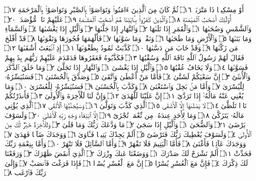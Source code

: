أَوْ مِسْكِينࣰا ذَا مَتْرَبَةࣲ ۝١٦ ثُمَّ كَانَ مِنَ ٱلَّذِينَ ءَامَنُوا۟ وَتَوَاصَوْا۟
بِٱلصَّبْرِ وَتَوَاصَوْا۟ بِٱلْمَرْحَمَةِ ۝١٧ أُو۟لَٰٓئِكَ أَصْحَٰبُ ٱلْمَيْمَنَةِ ۝١٨
وَٱلَّذِينَ كَفَرُوا۟ بِـَٔايَٰتِنَا هُمْ أَصْحَٰبُ ٱلْمَشْـَٔمَةِ ۝١٩ عَلَيْهِمْ نَارࣱ مُّؤْصَدَةُۢ ۝٢٠
وَٱلشَّمْسِ وَضُحَىٰهَا ۝١ وَٱلْقَمَرِ إِذَا تَلَىٰهَا ۝٢ وَٱلنَّهَارِ إِذَا جَلَّىٰهَا ۝٣
وَٱلَّيْلِ إِذَا يَغْشَىٰهَا ۝٤ وَٱلسَّمَآءِ وَمَا بَنَىٰهَا ۝٥ وَٱلْأَرْضِ
وَمَا طَحَىٰهَا ۝٦ وَنَفْسࣲ وَمَا سَوَّىٰهَا ۝٧ فَأَلْهَمَهَا فُجُورَهَا
وَتَقْوَىٰهَا ۝٨ قَدْ أَفْلَحَ مَن زَكَّىٰهَا ۝٩ وَقَدْ خَابَ مَن دَسَّىٰهَا ۝١٠
كَذَّبَتْ ثَمُودُ بِطَغْوَىٰهَآ ۝١١ إِذِ ٱنۢبَعَثَ أَشْقَىٰهَا ۝١٢ فَقَالَ لَهُمْ
رَسُولُ ٱللَّهِ نَاقَةَ ٱللَّهِ وَسُقْيَٰهَا ۝١٣ فَكَذَّبُوهُ فَعَقَرُوهَا فَدَمْدَمَ
عَلَيْهِمْ رَبُّهُم بِذَنۢبِهِمْ فَسَوَّىٰهَا ۝١٤ وَلَا يَخَافُ عُقْبَٰهَا ۝١٥
وَٱلَّيْلِ إِذَا يَغْشَىٰ ۝١ وَٱلنَّهَارِ إِذَا تَجَلَّىٰ ۝٢ وَمَا خَلَقَ ٱلذَّكَرَ وَٱلْأُنثَىٰٓ ۝٣
إِنَّ سَعْيَكُمْ لَشَتَّىٰ ۝٤ فَأَمَّا مَنْ أَعْطَىٰ وَٱتَّقَىٰ ۝٥ وَصَدَّقَ بِٱلْحُسْنَىٰ ۝٦
فَسَنُيَسِّرُهُۥ لِلْيُسْرَىٰ ۝٧ وَأَمَّا مَنۢ بَخِلَ وَٱسْتَغْنَىٰ ۝٨ وَكَذَّبَ بِٱلْحُسْنَىٰ ۝٩
فَسَنُيَسِّرُهُۥ لِلْعُسْرَىٰ ۝١٠ وَمَا يُغْنِي عَنْهُ مَالُهُۥٓ إِذَا تَرَدَّىٰٓ ۝١١ إِنَّ عَلَيْنَا
لَلْهُدَىٰ ۝١٢ وَإِنَّ لَنَا لَلْأٓخِرَةَ وَٱلْأُولَىٰ ۝١٣ فَأَنذَرْتُكُمْ نَارࣰا تَلَظَّىٰ ۝١٤
لَا يَصْلَىٰهَآ إِلَّا ٱلْأَشْقَى ۝١٥ ٱلَّذِي كَذَّبَ وَتَوَلَّىٰ ۝١٦ وَسَيُجَنَّبُهَا
ٱلْأَتْقَى ۝١٧ ٱلَّذِي يُؤْتِي مَالَهُۥ يَتَزَكَّىٰ ۝١٨ وَمَا لِأَحَدٍ عِندَهُۥ مِن نِّعْمَةࣲ
تُجْزَىٰٓ ۝١٩ إِلَّا ٱبْتِغَآءَ وَجْهِ رَبِّهِ ٱلْأَعْلَىٰ ۝٢٠ وَلَسَوْفَ يَرْضَىٰ ۝٢١
وَٱلضُّحَىٰ ۝١ وَٱلَّيْلِ إِذَا سَجَىٰ ۝٢ مَا وَدَّعَكَ رَبُّكَ وَمَا قَلَىٰ ۝٣
وَلَلْأٓخِرَةُ خَيْرࣱ لَّكَ مِنَ ٱلْأُولَىٰ ۝٤ وَلَسَوْفَ يُعْطِيكَ رَبُّكَ
فَتَرْضَىٰٓ ۝٥ أَلَمْ يَجِدْكَ يَتِيمࣰا فَـَٔاوَىٰ ۝٦ وَوَجَدَكَ ضَآلࣰّا فَهَدَىٰ ۝٧
وَوَجَدَكَ عَآئِلࣰا فَأَغْنَىٰ ۝٨ فَأَمَّا ٱلْيَتِيمَ فَلَا تَقْهَرْ ۝٩
وَأَمَّا ٱلسَّآئِلَ فَلَا تَنْهَرْ ۝١٠ وَأَمَّا بِنِعْمَةِ رَبِّكَ فَحَدِّثْ ۝١١
أَلَمْ نَشْرَحْ لَكَ صَدْرَكَ ۝١ وَوَضَعْنَا عَنكَ وِزْرَكَ ۝٢
ٱلَّذِيٓ أَنقَضَ ظَهْرَكَ ۝٣ وَرَفَعْنَا لَكَ ذِكْرَكَ ۝٤ فَإِنَّ مَعَ ٱلْعُسْرِ يُسْرًا ۝٥
إِنَّ مَعَ ٱلْعُسْرِ يُسْرࣰا ۝٦ فَإِذَا فَرَغْتَ فَٱنصَبْ ۝٧ وَإِلَىٰ رَبِّكَ فَٱرْغَب ۝٨

